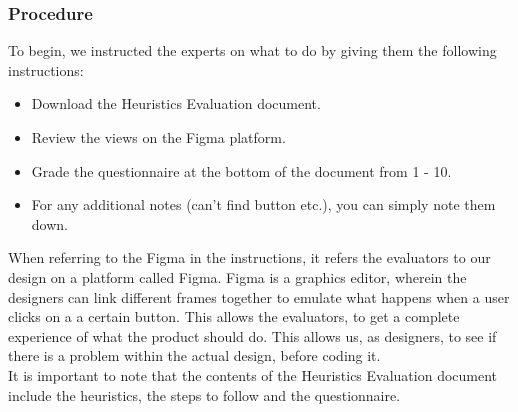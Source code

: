 \documentclass{article}
\begin{document}
    \subsubsection{Procedure}
    To begin, we instructed the experts on what to do by giving them the following instructions:
    \begin{itemize}
        \item Download the Heuristics Evaluation document.
        \item Review the views on the Figma platform.
        \item Grade the questionnaire at the bottom of the document from 1 - 10.
        \item For any additional notes (can't find button etc.), you can simply note them down.
    \end{itemize}
    When referring to the Figma in the instructions, it refers the evaluators to our design on a platform called Figma. Figma is a graphics editor, wherein the designers can link different frames together to emulate what happens when a user clicks on a a certain button. This allows the evaluators, to get a complete experience of what the product should do. This allows us, as designers, to see if there is a problem within the actual design, before coding it.\\

    It is important to note that the contents of the Heuristics Evaluation document include the heuristics, the steps to follow and the questionnaire.\\
\end{document}
